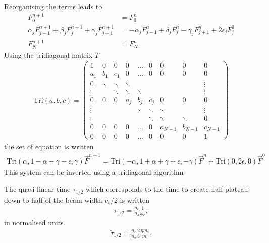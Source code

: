 \documentclass[10pt,a4paper]{article}
\begin{document}
Reorganising the terms leads to 
\begin{align}
F_0^{n+1}& =F_0^n\\
\alpha_jF_{j-1}^{n+1}+\beta_jF_j^{n+1}+\gamma_jF_{j+1}^{n+1} & = 
-\alpha_jF_{j-1}^n+\delta_jF_j^n-
\gamma_jF_{j+1}^n+2\epsilon_jF_j^0\\
F_N^{n+1}&=F_N^n
\end{align}
Using the tridiagonal matrix $T$
\begin{align}
\mathrm{Tri}(a,b,c)=
\begin{pmatrix}
1&0&0&0&\ldots&0&0&0&0\\
a_1&b_1&c_1&0&\ldots&0&0&0&0\\
0&\ddots&\ddots&\ddots&&&&&\vdots\\
\vdots&&\ddots&\ddots&\ddots&&&&\vdots\\
0&0&0&a_j&b_j&c_j&0&0&0\\
\vdots&&&&\ddots&\ddots&\ddots&&\vdots\\
\vdots&&&&&\ddots&\ddots&\ddots&0\\
0&0&0&0&\ldots&0&a_{N{-}1}&b_{N{-}1}&c_{N{-}1}\\
0&0&0&0&\ldots&0&0&0&1
\end{pmatrix}
\end{align}
the set of equation is written
\begin{align}
\mathrm{Tri}(\alpha,1{-}\alpha{-}\gamma{-}\epsilon,\gamma)\vec{F}^{n+1} =
\mathrm{Tri}(-\alpha,1{+}\alpha{+}\gamma{+}\epsilon,-\gamma)\vec{F}^{n} +
\mathrm{Tri}(0,2\epsilon,0)\vec{F}^{0}
\end{align}
This system can be inverted using a tridiagonal algorithm

The quasi-linear time $\tau_{1/2}$ which corresponds to the time to create
half-plateau down to half of the beam width $v_b/2$ is written \citep{kontar:2001}
\begin{align}
\tau_{1/2} = \frac{n_e}{n_b}\frac{1}{\omega_e},
\end{align}
in normalised units
\begin{align}
\tilde{\tau}_{1/2} = \frac{n_e}{n_b}\frac{2}{3}\frac{\eta m_e}{m_i}.
\end{align}




\end{document}
